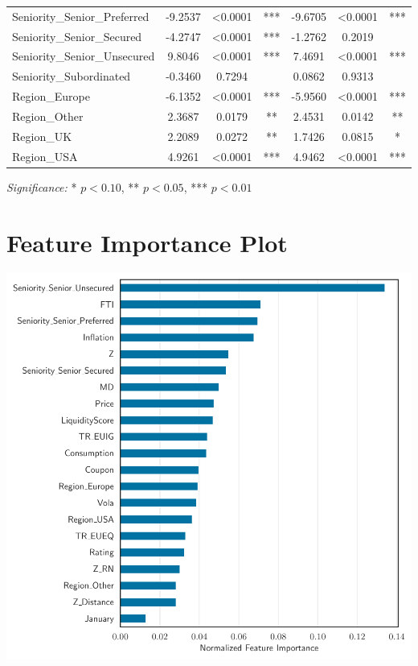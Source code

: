 \begin{center}
\begin{minipage}{\textwidth}
\begin{tabular}{lcccccc}
    Seniority\_Senior\_Preferred & -9.2537 & <0.0001 & *** & -9.6705 & <0.0001 & *** \\
    Seniority\_Senior\_Secured & -4.2747 & <0.0001 & *** & -1.2762 & 0.2019 &  \\
    Seniority\_Senior\_Unsecured & 9.8046 & <0.0001 & *** & 7.4691 & <0.0001 & *** \\
    Seniority\_Subordinated & -0.3460 & 0.7294 &  & 0.0862 & 0.9313 &  \\
    Region\_Europe & -6.1352 & <0.0001 & *** & -5.9560 & <0.0001 & *** \\
    Region\_Other & 2.3687 & 0.0179 & ** & 2.4531 & 0.0142 & ** \\
    Region\_UK & 2.2089 & 0.0272 & ** & 1.7426 & 0.0815 & * \\
    Region\_USA & 4.9261 & <0.0001 & *** & 4.9462 & <0.0001 & *** \\
    \bottomrule
    \end{tabular}
    \caption*{\textit{Significance:} * $p<0.10$, ** $p<0.05$, *** $p<0.01$}
    \label{tab:feature_t_statistics}
\end{minipage}
\end{center}

\section{Feature Importance Plot}
\begin{center}
\begin{minipage}{\textwidth}
    \centering
    \includegraphics[width=\textwidth]{images/feature_importance.pdf}
    \label{fig:feature_importance}
\end{minipage}
\end{center}